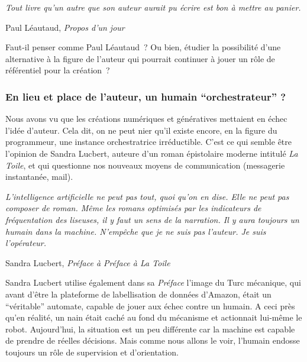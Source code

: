 \documentclass{article}
\newenvironment{citationbox}
{\begin{center}
		\begin{minipage}{.8\textwidth}
		}
		{
		\end{minipage}	
\end{center}
}
\begin{document}
					\begin{citationbox}
						\textit{Tout livre qu'un autre que son auteur aurait pu écrire est bon à mettre au panier.}
						\begin{flushright}
							Paul Léautaud, \textit{Propos d'un jour}
						\end{flushright}
					\end{citationbox}
					Faut-il penser comme Paul Léautaud~? Ou bien, étudier la possibilité d'une alternative à la figure de l'auteur qui pourrait continuer à jouer un rôle de référentiel pour la création~?
			

			\subsubsection{En lieu et place de l'auteur, un humain ``orchestrateur'' ?}
				Nous avons vu que les créations numériques et génératives mettaient en échec l'idée d'auteur. Cela dit, on ne peut nier qu'il existe encore, en la figure du programmeur, une instance orchestratrice irréductible. C'est ce qui semble être l'opinion de Sandra Lucbert, auteure d'un roman épistolaire moderne intitulé \textit{La Toile}, et qui questionne nos nouveaux moyens de communication (messagerie instantanée, mail).
				\begin{citationbox}
					\textit{L’intelligence	artificielle	ne	peut	pas	tout,	quoi	qu’on	en	dise.
						Elle	 ne	 peut	 pas	 composer	 de	 roman.	 Même	 les	 romans	 optimisés	 par	 les
						indicateurs	 de	 fréquentation	 des	 liseuses,	 il	 y	 faut	 un	 sens	 de	 la	 narration.	 Il	 y
						aura	toujours	un	humain	dans	la	machine.	N’empêche	que	je	ne	suis	pas	l’auteur.
						Je	 suis	 l’opérateur.}	
					\begin{flushright}
						Sandra Lucbert, \textit{Préface à Préface à La Toile}
					\end{flushright}
				\end{citationbox}
				Sandra Lucbert utilise également dans sa \textit{Préface} l'image du Turc mécanique, qui avant d'être la plateforme de labellisation de données d'Amazon, était un ``véritable'' automate, capable de jouer aux échec contre un humain. A ceci près qu'en réalité, un nain était caché au fond du mécanisme et actionnait lui-même le robot. Aujourd'hui, la situation est un peu différente car la machine est capable de prendre de réelles décisions. Mais comme nous allons le voir, l'humain endosse toujours un rôle de supervision et d'orientation.\\
				
\end{document}
